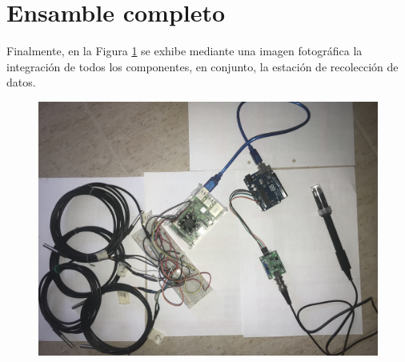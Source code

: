 \section{Ensamble completo}

    \par Finalmente, en la Figura \ref{fig:EsquemaCompletoHardware} se exhibe mediante una imagen fotográfica la integración de todos los componentes, en conjunto, la estación de recolección de datos.\\

    \begin{figure}[H]
    \centering
        \includegraphics[scale=0.09]{hardware/SistemaEnsamblado.jpeg}
        \label{fig:EsquemaCompletoHardware}
    \end{figure}

    
